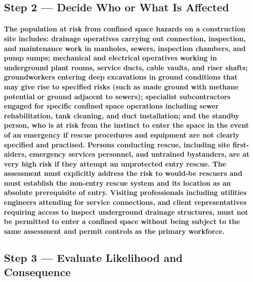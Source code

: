 \subsection{Step 2 --- Decide Who or What Is Affected}
\paragraph{The population at risk from confined space hazards on a construction site includes: drainage operatives carrying out connection, inspection, and maintenance work in manholes, sewers, inspection chambers, and pump sumps; mechanical and electrical operatives working in underground plant rooms, service ducts, cable vaults, and riser shafts; groundworkers entering deep excavations in ground conditions that may give rise to specified risks (such as made ground with methane potential or ground adjacent to sewers); specialist subcontractors engaged for specific confined space operations including sewer rehabilitation, tank cleaning, and duct installation; and the standby person, who is at risk from the instinct to enter the space in the event of an emergency if rescue procedures and equipment are not clearly specified and practised. Persons conducting rescue, including site first-aiders, emergency services personnel, and untrained bystanders, are at very high risk if they attempt an unprotected entry rescue. The assessment must explicitly address the risk to would-be rescuers and must establish the non-entry rescue system and its location as an absolute prerequisite of entry. Visiting professionals including utilities engineers attending for service connections, and client representatives requiring access to inspect underground drainage structures, must not be permitted to enter a confined space without being subject to the same assessment and permit controls as the primary workforce.}

\subsection{Step 3 --- Evaluate Likelihood and Consequence}
